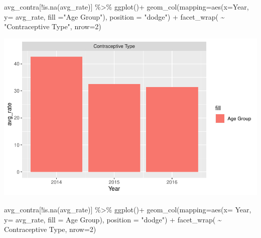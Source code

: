 \documentclass[
]{article}
\newenvironment{Shaded}{\begin{snugshade}}{\end{snugshade}}
\newcommand{\AttributeTok}[1]{\textcolor[rgb]{0.77,0.63,0.00}{#1}}
\newcommand{\DecValTok}[1]{\textcolor[rgb]{0.00,0.00,0.81}{#1}}
\newcommand{\FunctionTok}[1]{\textcolor[rgb]{0.00,0.00,0.00}{#1}}
\newcommand{\NormalTok}[1]{#1}
\newcommand{\SpecialCharTok}[1]{\textcolor[rgb]{0.00,0.00,0.00}{#1}}
\newcommand{\StringTok}[1]{\textcolor[rgb]{0.31,0.60,0.02}{#1}}
\begin{document}
\begin{Shaded}
\begin{Highlighting}[]
\NormalTok{avg\_contra[}\SpecialCharTok{!}\FunctionTok{is.na}\NormalTok{(}\StringTok{\textasciigrave{}}\AttributeTok{avg\_rate}\StringTok{\textasciigrave{}}\NormalTok{)] }\SpecialCharTok{\%\textgreater{}\%} 
  \FunctionTok{ggplot}\NormalTok{()}\SpecialCharTok{+}
\FunctionTok{geom\_col}\NormalTok{(}\AttributeTok{mapping=}\FunctionTok{aes}\NormalTok{(}\AttributeTok{x=}\NormalTok{Year, }\AttributeTok{y=}\NormalTok{ avg\_rate, }\AttributeTok{fill =}\StringTok{"Age Group"}\NormalTok{), }\AttributeTok{position =} \StringTok{"dodge"}\NormalTok{) }\SpecialCharTok{+}
\FunctionTok{facet\_wrap}\NormalTok{( }\SpecialCharTok{\textasciitilde{}} \StringTok{"Contraceptive Type"}\NormalTok{, }\AttributeTok{nrow=}\DecValTok{2}\NormalTok{)}
\end{Highlighting}
\end{Shaded}

\begin{center}\includegraphics[width=700px]{Report_files/figure-latex/unnamed-chunk-10-1} \end{center}

\begin{Shaded}
\begin{Highlighting}[]
\NormalTok{avg\_contra[}\SpecialCharTok{!}\FunctionTok{is.na}\NormalTok{(}\StringTok{\textasciigrave{}}\AttributeTok{avg\_rate}\StringTok{\textasciigrave{}}\NormalTok{)] }\SpecialCharTok{\%\textgreater{}\%} 
  \FunctionTok{ggplot}\NormalTok{()}\SpecialCharTok{+}
  \FunctionTok{geom\_col}\NormalTok{(}\AttributeTok{mapping=}\FunctionTok{aes}\NormalTok{(}\AttributeTok{x=}\NormalTok{ Year, }\AttributeTok{y=}\NormalTok{ avg\_rate, }\AttributeTok{fill =} \StringTok{\textasciigrave{}}\AttributeTok{Age Group}\StringTok{\textasciigrave{}}\NormalTok{), }\AttributeTok{position =} \StringTok{"dodge"}\NormalTok{) }\SpecialCharTok{+}
\FunctionTok{facet\_wrap}\NormalTok{( }\SpecialCharTok{\textasciitilde{}} \StringTok{\textasciigrave{}}\AttributeTok{Contraceptive Type}\StringTok{\textasciigrave{}}\NormalTok{, }\AttributeTok{nrow=}\DecValTok{2}\NormalTok{)}
\end{Highlighting}
\end{Shaded}
\end{document}

